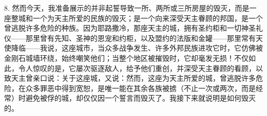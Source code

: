 8. 然而今天，我准备展示的并非起誓导致一所、两所或三所房屋的毁灭，而是一座整城和一个为天主所爱的民族的毁灭；是一个向来深受天主眷顾的邦国，是一个曾逃脱许多危险的种族。因为耶路撒冷，那座天主的城，拥有圣约柜和一切神圣礼仪——那里曾有先知、圣神的恩宠和约柜，以及盟约的法版和金罐——那里常有天使降临——我说，这座城市，当众多战争发生、许多外邦民族进攻它时，它仿佛被金刚石城墙环绕，始终嘲笑他们；当整个地区被摧毁时，它却毫发无损！不仅如此，令人惊叹的是，它屡次驱逐敌人，给予他们重创，并深受天主眷顾的看顾，以致天主曾亲口说：关于这座城，又说：然而，这座为天主所爱的城，曾逃脱许多危险，在众多罪恶中得到宽恕，是唯一能在其余各族被掳（不止一次或两次，而是经常）时避免被俘的城，却仅仅因一个誓言而毁灭了。我接下来就说明是如何毁灭的。\par

